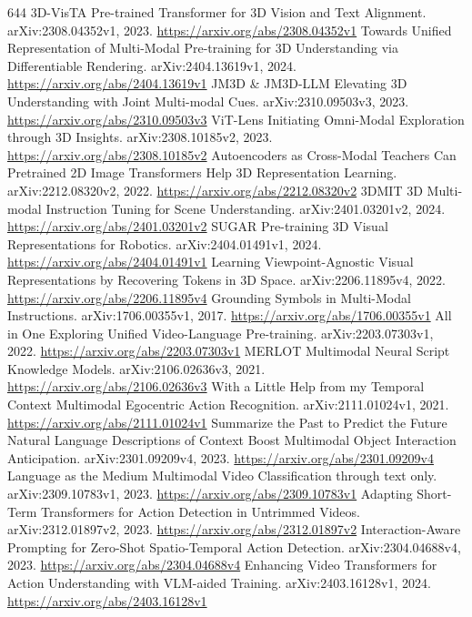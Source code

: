 \documentclass[11pt]{article}
\begin{document}
\begin{thebibliography}{644}
 3D-VisTA Pre-trained Transformer for 3D Vision and Text Alignment. arXiv:2308.04352v1, 2023. \url{https://arxiv.org/abs/2308.04352v1}
 Towards Unified Representation of Multi-Modal Pre-training for 3D Understanding via Differentiable Rendering. arXiv:2404.13619v1, 2024. \url{https://arxiv.org/abs/2404.13619v1}
 JM3D \& JM3D-LLM Elevating 3D Understanding with Joint Multi-modal Cues. arXiv:2310.09503v3, 2023. \url{https://arxiv.org/abs/2310.09503v3}
 ViT-Lens Initiating Omni-Modal Exploration through 3D Insights. arXiv:2308.10185v2, 2023. \url{https://arxiv.org/abs/2308.10185v2}
 Autoencoders as Cross-Modal Teachers Can Pretrained 2D Image Transformers Help 3D Representation Learning. arXiv:2212.08320v2, 2022. \url{https://arxiv.org/abs/2212.08320v2}
 3DMIT 3D Multi-modal Instruction Tuning for Scene Understanding. arXiv:2401.03201v2, 2024. \url{https://arxiv.org/abs/2401.03201v2}
 SUGAR Pre-training 3D Visual Representations for Robotics. arXiv:2404.01491v1, 2024. \url{https://arxiv.org/abs/2404.01491v1}
 Learning Viewpoint-Agnostic Visual Representations by Recovering Tokens in 3D Space. arXiv:2206.11895v4, 2022. \url{https://arxiv.org/abs/2206.11895v4}
 Grounding Symbols in Multi-Modal Instructions. arXiv:1706.00355v1, 2017. \url{https://arxiv.org/abs/1706.00355v1}
 All in One Exploring Unified Video-Language Pre-training. arXiv:2203.07303v1, 2022. \url{https://arxiv.org/abs/2203.07303v1}
 MERLOT Multimodal Neural Script Knowledge Models. arXiv:2106.02636v3, 2021. \url{https://arxiv.org/abs/2106.02636v3}
 With a Little Help from my Temporal Context Multimodal Egocentric Action Recognition. arXiv:2111.01024v1, 2021. \url{https://arxiv.org/abs/2111.01024v1}
 Summarize the Past to Predict the Future Natural Language Descriptions of Context Boost Multimodal Object Interaction Anticipation. arXiv:2301.09209v4, 2023. \url{https://arxiv.org/abs/2301.09209v4}
 Language as the Medium Multimodal Video Classification through text only. arXiv:2309.10783v1, 2023. \url{https://arxiv.org/abs/2309.10783v1}
 Adapting Short-Term Transformers for Action Detection in Untrimmed Videos. arXiv:2312.01897v2, 2023. \url{https://arxiv.org/abs/2312.01897v2}
 Interaction-Aware Prompting for Zero-Shot Spatio-Temporal Action Detection. arXiv:2304.04688v4, 2023. \url{https://arxiv.org/abs/2304.04688v4}
 Enhancing Video Transformers for Action Understanding with VLM-aided Training. arXiv:2403.16128v1, 2024. \url{https://arxiv.org/abs/2403.16128v1}

\end{thebibliography}
\end{document}
